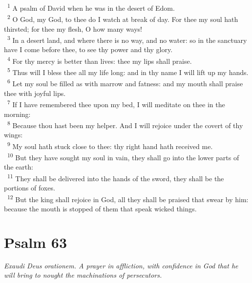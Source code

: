 \documentclass[a5paper,12pt]{article}
\begin{document}
\begin{multicols*}{2}
~\textsuperscript{1} A psalm of David when he was in the desert of Edom.\\
~\textsuperscript{2} O God, my God, to thee do I watch at break of day. For thee my soul hath thirsted; for thee my flesh, O how many ways!\\
~\textsuperscript{3} In a desert land, and where there is no way, and no water: so in the sanctuary have I come before thee, to see thy power and thy glory.\\
~\textsuperscript{4} For thy mercy is better than lives: thee my lips shall praise.\\
~\textsuperscript{5} Thus will I bless thee all my life long: and in thy name I will lift up my hands.\\
~\textsuperscript{6} Let my soul be filled as with marrow and fatness: and my mouth shall praise thee with joyful lips.\\
~\textsuperscript{7} If I have remembered thee upon my bed, I will meditate on thee in the morning:\\
~\textsuperscript{8} Because thou hast been my helper. And I will rejoice under the covert of thy wings:\\
~\textsuperscript{9} My soul hath stuck close to thee: thy right hand hath received me.\\
~\textsuperscript{10} But they have sought my soul in vain, they shall go into the lower parts of the earth:\\
~\textsuperscript{11} They shall be delivered into the hands of the sword, they shall be the portions of foxes.\\
~\textsuperscript{12} But the king shall rejoice in God, all they shall be praised that swear by him: because the mouth is stopped of them that speak wicked things.\\

\section{Psalm 63}
\label{sec:orgab7107b}
\emph{Exaudi Deus orationem. A prayer in affliction, with confidence in God that he will bring to nought the machinations of persecutors.}\\


\end{multicols*}
\end{document}
